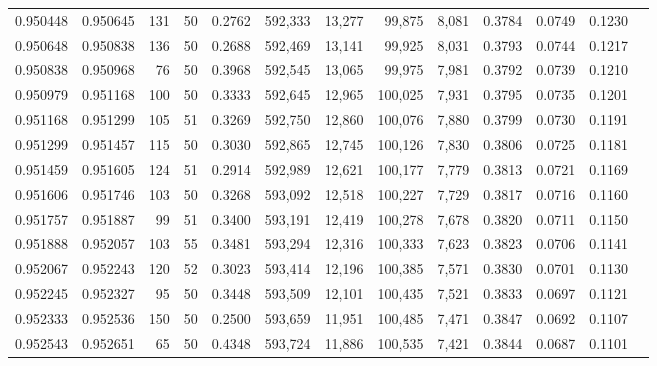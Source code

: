 \begin{tabular}{rrrrrrrrrrrrr}
0.950448 & 0.950645 &   131 &  50 &                                     0.2762 & 592,333 &  13,277 &  99,875 &   8,081 & 0.3784 & 0.0749 & 0.1230 \\
0.950648 & 0.950838 &   136 &  50 &                                     0.2688 & 592,469 &  13,141 &  99,925 &   8,031 & 0.3793 & 0.0744 & 0.1217 \\
0.950838 & 0.950968 &    76 &  50 &                                     0.3968 & 592,545 &  13,065 &  99,975 &   7,981 & 0.3792 & 0.0739 & 0.1210 \\
0.950979 & 0.951168 &   100 &  50 &                                     0.3333 & 592,645 &  12,965 & 100,025 &   7,931 & 0.3795 & 0.0735 & 0.1201 \\
0.951168 & 0.951299 &   105 &  51 &                                     0.3269 & 592,750 &  12,860 & 100,076 &   7,880 & 0.3799 & 0.0730 & 0.1191 \\
0.951299 & 0.951457 &   115 &  50 &                                     0.3030 & 592,865 &  12,745 & 100,126 &   7,830 & 0.3806 & 0.0725 & 0.1181 \\
0.951459 & 0.951605 &   124 &  51 &                                     0.2914 & 592,989 &  12,621 & 100,177 &   7,779 & 0.3813 & 0.0721 & 0.1169 \\
0.951606 & 0.951746 &   103 &  50 &                                     0.3268 & 593,092 &  12,518 & 100,227 &   7,729 & 0.3817 & 0.0716 & 0.1160 \\
0.951757 & 0.951887 &    99 &  51 &                                     0.3400 & 593,191 &  12,419 & 100,278 &   7,678 & 0.3820 & 0.0711 & 0.1150 \\
0.951888 & 0.952057 &   103 &  55 &                                     0.3481 & 593,294 &  12,316 & 100,333 &   7,623 & 0.3823 & 0.0706 & 0.1141 \\
0.952067 & 0.952243 &   120 &  52 &                                     0.3023 & 593,414 &  12,196 & 100,385 &   7,571 & 0.3830 & 0.0701 & 0.1130 \\
0.952245 & 0.952327 &    95 &  50 &                                     0.3448 & 593,509 &  12,101 & 100,435 &   7,521 & 0.3833 & 0.0697 & 0.1121 \\
0.952333 & 0.952536 &   150 &  50 &                                     0.2500 & 593,659 &  11,951 & 100,485 &   7,471 & 0.3847 & 0.0692 & 0.1107 \\
0.952543 & 0.952651 &    65 &  50 &                                     0.4348 & 593,724 &  11,886 & 100,535 &   7,421 & 0.3844 & 0.0687 & 0.1101 \\

\end{tabular}
